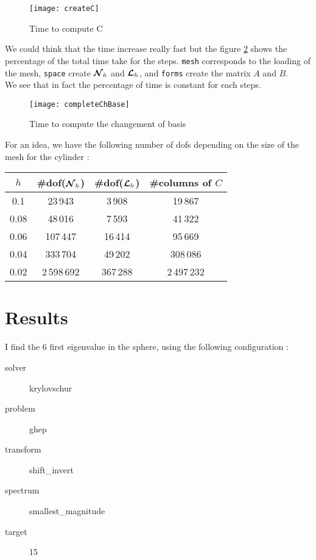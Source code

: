 \begin{figure}[H]
  \centering
  \texttt{[image: createC]}
  \caption{Time to compute C}
  \label{timeC}
\end{figure}

We could think that the time increase really fast but the figure \ref{completeTime} shows the percentage of the total time take for the steps. \texttt{mesh} corresponds to the loading of the mesh, \texttt{space} create ${\bm{\mathcal{N}}}_h$ and ${\bm{\mathcal{L}}}_h$, and \texttt{forms} create the matrix $A$ and $B$.\\
We see that in fact the percentage of time is constant for each steps.

\begin{figure}[H]
  \centering
  \texttt{[image: completeChBase]}
  \caption{Time to compute the changement of basis}
  \label{completeTime}
\end{figure}

For an idea, we have the following number of dofs depending on the size of the mesh for the cylinder :
\begin{center}
  \begin{tabular}{ c | c | c | c }
    $h$ & \#dof(${\bm{\mathcal{N}}}_h$) & \#dof(${\bm{\mathcal{L}}}_h$) & \#columns of $C$ \\ \hline
    0.1 & 23\,943 & 3\,908 & 19\,867 \\ \hline
    0.08 & 48\,016 & 7\,593 & 41\,322 \\ \hline
    0.06 & 107\,447 & 16\,414 & 95\,669 \\ \hline
    0.04 & 333\,704 & 49\,202 & 308\,086 \\ \hline
    0.02 & 2\,598\,692 & 367\,288 & 2\,497\,232 \\ \hline
  \end{tabular}
\end{center}

\section{Results}

I find the 6 first eigenvalue in the sphere, using the following configuration :
\begin{description}
\item[solver] krylovschur
\item[problem] ghep
\item[transform] shift\_invert
\item[spectrum] smallest\_magnitude
\item[target] 15
\end{description}

